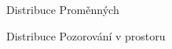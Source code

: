 \documentclass[11pt, a4paper]{article}
\begin{document}
\begin{figure}[ht]
    \centering
        \noindent{}
    \caption{Distribuce Proměnných}
    \label{Distribuce Proměných}
\end{figure}

\clearpage

\begin{figure}[ht]
    \centering
        \noindent{}
    \caption{Distribuce Pozorování v prostoru}
    \label{Distribuce pozorování v prostoru}
\end{figure}
\end{document}
